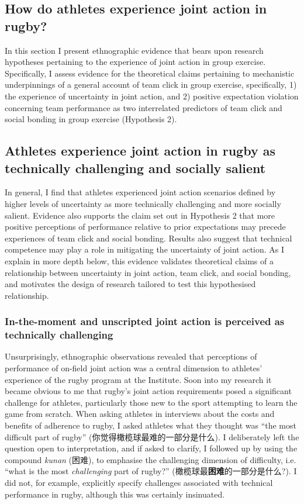 \begin{CJK}{UTF8}{gbsn}
\section{How do athletes experience joint action in rugby?}
In this section I present ethnographic evidence that bears upon research hypotheses pertaining to the experience of joint action in group exercise.  Specifically, I assess evidence for the theoretical claims pertaining to mechanistic underpinnings of a general account of team click in group exercise, specifically, 1) the experience of uncertainty in joint action, and 2) positive expectation violation concerning team performance as two interrelated predictors of team click and social bonding in group exercise (Hypothesis 2).

\subsection{Athletes experience joint action in rugby as technically challenging and socially salient}
In general, I find that athletes experienced joint action scenarios defined by higher levels of uncertainty as more technically challenging and more socially salient. Evidence also supports the claim set out in Hypothesis 2 that more positive perceptions of performance relative to prior expectations may precede experiences of team click and social bonding.  Results also suggest that technical competence may play a role in mitigating the uncertainty of joint action.  As I explain in more depth below, this evidence validates theoretical claims of a relationship between uncertainty in joint action, team click, and social bonding, and motivates the design of research tailored to test this hypothesised relationship.

\subsubsection{In-the-moment and unscripted joint action is perceived as technically challenging}
Unsurprisingly, ethnographic observations revealed that perceptions of performance of on-field joint action was a central dimension to athletes' experience of the rugby program at the Institute.  Soon into my research it became obvious to me that rugby's joint action requirements posed a significant challenge for athletes, particularly those new to the sport attempting to learn the game from scratch.  When asking athletes in interviews about the costs and benefits of adherence to rugby, I asked athletes what they thought was ``the most difficult part of rugby'' (你觉得橄榄球最难的一部分是什么).  I deliberately left the question open to interpretation, and if asked to clarify, I followed up by using the compound \textit{kunan} (困难), to emphasise the challenging dimension of difficulty, i.e. ``what is the most \textit{challenging} part of rugby?'' (橄榄球最\textbf{困难}的一部分是什么?). I did not, for example, explicitly specify challenges associated with technical performance in rugby, although this was certainly insinuated.


\end{CJK}

